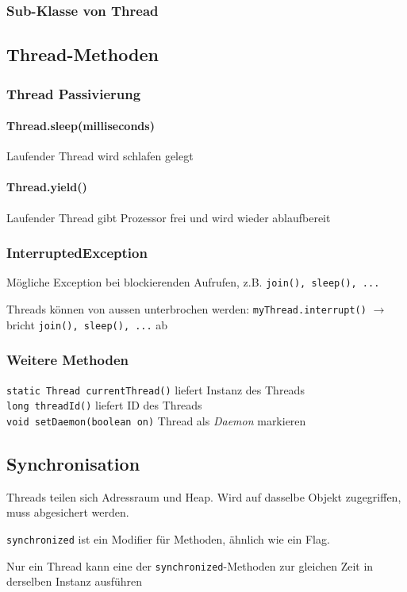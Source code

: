 \subsubsection{Sub-Klasse von Thread}



\subsection{Thread-Methoden}

\subsubsection{Thread Passivierung}
\paragraph{Thread.sleep(milliseconds)}
Laufender Thread wird schlafen gelegt

\paragraph{Thread.yield()}
Laufender Thread gibt Prozessor frei und wird wieder ablaufbereit

\subsubsection{InterruptedException}
Mögliche Exception bei blockierenden Aufrufen, z.B. \verb|join(), sleep(), ...|

Threads können von aussen unterbrochen werden: \verb|myThread.interrupt()| $\rightarrow$ bricht \verb|join(), sleep(), ...| ab

\subsubsection{Weitere Methoden}
\verb|static Thread currentThread()| liefert Instanz des Threads \\

\verb|long threadId()| liefert ID des Threads \\

\verb|void setDaemon(boolean on)| Thread als \textit{Daemon} markieren

\subsection{Synchronisation}
Threads teilen sich Adressraum und Heap. Wird auf dasselbe Objekt zugegriffen, muss abgesichert werden.

\verb|synchronized| ist ein Modifier für Methoden, ähnlich wie ein Flag.

Nur ein Thread kann eine der \verb|synchronized|-Methoden zur gleichen Zeit in derselben Instanz ausführen